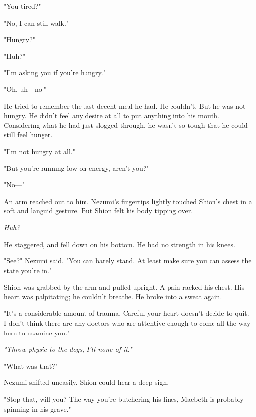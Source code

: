 "You tired?"

"No, I can still walk."

"Hungry?"

"Huh?"

"I'm asking you if you're hungry."

"Oh, uh---no."

He tried to remember the last decent meal he had. He couldn't. But he
was not hungry. He didn't feel any desire at all to put anything into
his mouth. Considering what he had just slogged through, he wasn't so
tough that he could still feel hunger.

"I'm not hungry at all."

"But you're running low on energy, aren't you?"

"No---"

An arm reached out to him. Nezumi's fingertips lightly touched Shion's
chest in a soft and languid gesture. But Shion felt his body tipping
over.

\emph{Huh?}

He staggered, and fell down on his bottom. He had no strength in his
knees.

"See?" Nezumi said. "You can barely stand. At least make sure you can
assess the state you're in."

Shion was grabbed by the arm and pulled upright. A pain racked his
chest. His heart was palpitating; he couldn't breathe. He broke into a
sweat again.

"It's a considerable amount of trauma. Careful your heart doesn't decide
to quit. I don't think there are any doctors who are attentive enough to
come all the way here to examine you."

\emph{"Throw physic to the dogs, I'll none of it."}

"What was that?"


Nezumi shifted uneasily. Shion could hear a deep sigh.

"Stop that, will you? The way you're butchering his lines, Macbeth is
probably spinning in his grave."

